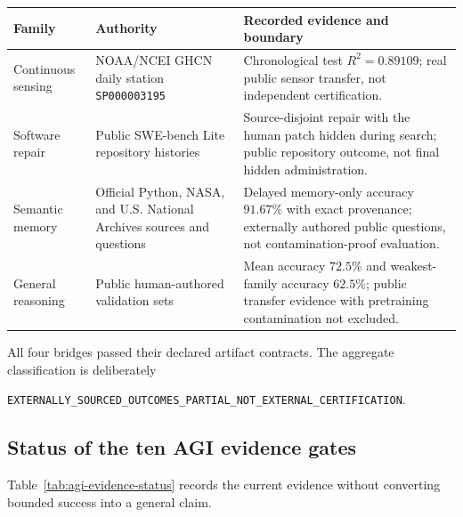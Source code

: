 \begin{center}
\small
\begin{tabular}{|>{\raggedright\arraybackslash}p{2.8cm}|>{\raggedright\arraybackslash}p{3.3cm}|>{\raggedright\arraybackslash}p{5.7cm}|}
\hline
\textbf{Family} & \textbf{Authority} & \textbf{Recorded evidence and boundary} \\
\hline
Continuous sensing & NOAA/NCEI GHCN daily station \texttt{SP000003195} & Chronological test $R^2=0.89109$; real public sensor transfer, not independent certification. \\
\hline
Software repair & Public SWE-bench Lite repository histories & Source-disjoint repair with the human patch hidden during search; public repository outcome, not final hidden administration. \\
\hline
Semantic memory & Official Python, NASA, and U.S. National Archives sources and questions & Delayed memory-only accuracy $91.67\%$ with exact provenance; externally authored public questions, not contamination-proof evaluation. \\
\hline
General reasoning & Public human-authored validation sets & Mean accuracy $72.5\%$ and weakest-family accuracy $62.5\%$; public transfer evidence with pretraining contamination not excluded. \\
\hline
\end{tabular}
\end{center}

All four bridges passed their declared artifact contracts.  The aggregate
classification is deliberately
\begin{center}
\texttt{EXTERNALLY\_SOURCED\_OUTCOMES\_PARTIAL\_NOT\_EXTERNAL\_CERTIFICATION}.
\end{center}


\subsection{Status of the ten AGI evidence gates}
\label{subsec:agi-gate-status}

Table~\ref{tab:agi-evidence-status} records the current evidence without
converting bounded success into a general claim.

